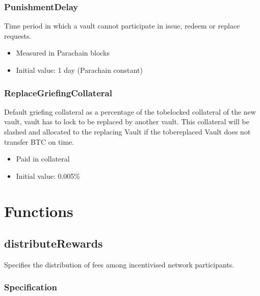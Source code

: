 \documentclass[a4paper,10pt,english]{sphinxmanual}
\begin{document}
\subsubsection{PunishmentDelay}
\label{\detokenize{spec/fee:punishmentdelay}}
Time period in which a vault cannot participate in issue, redeem or replace requests.
\begin{itemize}
\item {} 
Measured in Parachain blocks

\item {} 
Initial value: 1 day (Parachain constant)

\end{itemize}


\subsubsection{ReplaceGriefingCollateral}
\label{\detokenize{spec/fee:replacegriefingcollateral}}\label{\detokenize{spec/fee:id4}}
Default griefing collateral as a percentage of the to\sphinxhyphen{}be\sphinxhyphen{}locked collateral of the new vault, vault has to lock to be replaced by another vault. This collateral will be slashed and allocated to the replacing Vault if the to\sphinxhyphen{}be\sphinxhyphen{}replaced Vault does not transfer BTC on time.
\begin{itemize}
\item {} 
Paid in collateral

\item {} 
Initial value: 0.005\%

\end{itemize}


\section{Functions}
\label{\detokenize{spec/fee:functions}}

\subsection{distributeRewards}
\label{\detokenize{spec/fee:distributerewards}}
Specifies the distribution of fees among incentivised network participants.


\subsubsection{Specification}
\label{\detokenize{spec/fee:specification}}
\end{document}
